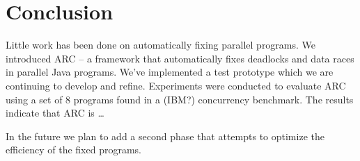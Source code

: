 \section{Conclusion}
\label{sec:conclusion}

Little work has been done on automatically fixing parallel programs. We
introduced ARC -- a framework that automatically fixes deadlocks and data races
in parallel Java programs. We've implemented a test prototype which we are
continuing to develop and refine.  Experiments were conducted to evaluate ARC
using a set of 8 programs found in a (IBM?) concurrency benchmark. The results
indicate that ARC is \ldots

In the future we plan to add a second phase that attempts to optimize the
efficiency of the fixed programs.

